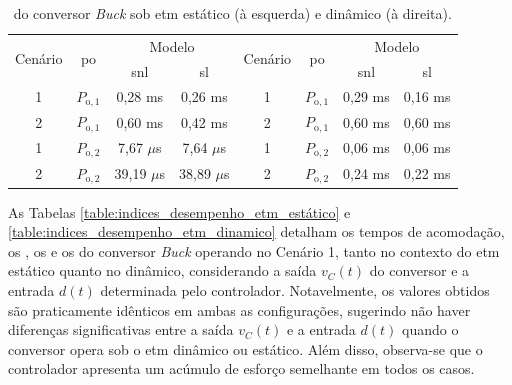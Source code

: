 \vspace{12pt}
\begin{table}[H]
  \centering
  \captionsetup{justification=centering}
  \setlength{\tabcolsep}{10pt}
  \begin{tabular}{cccccccc}
    \toprule
    \multirow{2}{*}{\centering Cenário} & \multirow{2}{*}{\centering \acrshort{po}} & \multicolumn{2}{c}{\centering Modelo} & \multirow{2}{*}{\centering Cenário} & \multirow{2}{*}{\centering \acrshort{po}} & \multicolumn{2}{c}{\centering Modelo}                     \\
    \cmidrule(lr){3-4} \cmidrule(lr){7-8}                      &                                           & \acrshort{snl}                                    & \acrshort{sl}                                   &                                           &                                       & \acrshort{snl}      & \acrshort{sl}       \\
    \midrule
    1                                   & $P_{\mathrm{o}, 1}$                       & 0,28 ms                               & 0,26 ms                             & 1                                         & $P_{\mathrm{o}, 1}$                   & 0,29 ms & 0,16 ms \\
    2                                   & $P_{\mathrm{o}, 1}$                       & 0,60 ms                               & 0,42 ms                             & 2                                         & $P_{\mathrm{o}, 1}$                   & 0,60 ms & 0,60 ms \\
    1                                   & $P_{\mathrm{o}, 2}$                       & 7,67 $\mu$s                           & 7,64 $\mu$s                         & 1                                         & $P_{\mathrm{o}, 2}$                   & 0,06 ms & 0,06 ms \\
    2                                   & $P_{\mathrm{o}, 2}$                       & 39,19 $\mu$s                          & 38,89 $\mu$s                        & 2                                         & $P_{\mathrm{o}, 2}$                   & 0,24 ms & 0,22 ms \\
    \bottomrule
  \end{tabular}
  \caption{ do conversor \textit{Buck} sob \acrshort{etm} estático (à esquerda) e dinâmico (à direita).}
  \label{table:imees_buck_static_dynamic}
\end{table}

As Tabelas \ref{table:indices_desempenho_etm_estático} e \ref{table:indices_desempenho_etm_dinamico} detalham os tempos de acomodação, os , os  e os  do conversor \textit{Buck} operando no Cenário 1, tanto no contexto do \acrshort{etm} estático quanto no dinâmico, considerando a saída $v_C(t)$ do conversor e a entrada $d(t)$ determinada pelo controlador. Notavelmente, os valores obtidos são praticamente idênticos em ambas as configurações, sugerindo não haver diferenças significativas entre a saída $v_C(t)$ e a entrada $d(t)$ quando o conversor opera sob o \acrshort{etm} dinâmico ou estático. Além disso, observa-se que o controlador apresenta um acúmulo de esforço semelhante em todos os casos. 

